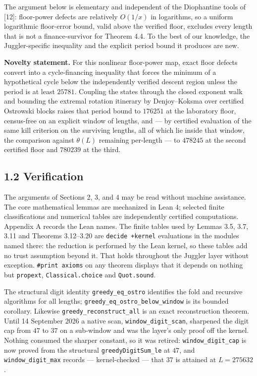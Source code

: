 \documentclass[12pt]{article}
\begin{document}
The argument below is elementary and independent of the Diophantine
tools of {[}12{]}: floor-power defects are relatively \(O(1/x)\) in
logarithms, so a uniform logarithmic floor-error bound, valid above the
verified floor, excludes every length that is not a finance-survivor for
Theorem 4.4. To the best of our knowledge, the Juggler-specific
inequality and the explicit period bound it produces are new.

\textbf{Novelty statement.} For this nonlinear floor-power map, exact
floor defects convert into a cycle-financing inequality that forces the
minimum of a hypothetical cycle below the independently verified descent
region unless the period is at least \(25781\). Coupling the states
through the closed exponent walk and bounding the extremal rotation
itinerary by Denjoy--Koksma over certified Ostrowski blocks raises that
period bound to \(176251\) at the laboratory floor, census-free on an
explicit window of lengths, and --- by certified evaluation of the same
kill criterion on the surviving lengths, all of which lie inside that
window, the comparison against \(\theta(L)\) remaining per-length --- to
\(478245\) at the second certified floor and \(780239\) at the third.

\subsection{1.2 Verification}\label{verification}

The arguments of Sections 2, 3, and 4 may be read without machine
assistance. The core mathematical lemmas are mechanized in Lean 4;
selected finite classifications and numerical tables are independently
certified computations. Appendix A records the Lean names. The finite
tables used by Lemmas 3.5, 3.7, 3.11 and Theorems 3.12--3.20 are
\texttt{decide\ +kernel} evaluations in the modules named there: the
reduction is performed by the Lean kernel, so these tables add no trust
assumption beyond it. That holds throughout the Juggler layer without
exception. \texttt{\#print\ axioms} on any theorem displays that it
depends on nothing but \texttt{\nolinkurl{propext}},
\texttt{\nolinkurl{Classical.choice}} and
\texttt{\nolinkurl{Quot.sound}}.

The structural digit identity \texttt{\nolinkurl{greedy_eq_ostro}}
identifies the fold and recursive algorithms for all lengths;
\texttt{\nolinkurl{greedy_eq_ostro_below_window}} is its bounded
corollary. Likewise \texttt{\nolinkurl{greedy_reconstruct_all}} is an
exact reconstruction theorem. Until 14 September 2026 a native scan,
\texttt{\nolinkurl{window_digit_scan}}, sharpened the digit cap from
\(47\) to \(37\) on a sub-window and was the layer's only proof off the
kernel. Nothing consumed the sharper constant, so it was retired:
\texttt{\nolinkurl{window_digit_cap}} is now proved from the structural
\texttt{\nolinkurl{greedyDigitSum_le}} at \(47\), and
\texttt{\nolinkurl{window_digit_max}} records --- kernel-checked ---
that \(37\) is attained at \(L = 275632\).
\end{document}
